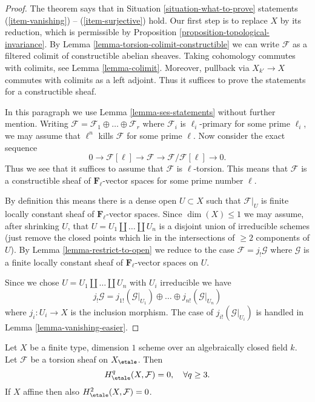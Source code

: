 \begin{proof}
The theorem says that in Situation \ref{situation-what-to-prove}
statements (\ref{item-vanishing}) -- (\ref{item-surjective}) hold.
Our first step is to replace $X$ by its reduction, which is permissible
by Proposition \ref{proposition-topological-invariance}.
By Lemma \ref{lemma-torsion-colimit-constructible} we can write
$\mathcal{F}$ as a filtered colimit of constructible abelian sheaves.
Taking cohomology commutes with colimits, see Lemma \ref{lemma-colimit}.
Moreover, pullback via $X_{k'} \to X$ commutes with colimits as a left
adjoint. Thus it suffices to prove the statements for a constructible sheaf.

\medskip\noindent
In this paragraph we use Lemma \ref{lemma-ses-statements} without further
mention. Writing
$\mathcal{F} = \mathcal{F}_1 \oplus \ldots \oplus \mathcal{F}_r$
where $\mathcal{F}_i$ is $\ell_i$-primary for some prime $\ell_i$, we may
assume that $\ell^n$ kills $\mathcal{F}$ for some prime $\ell$. Now consider
the exact sequence
$$
0 \to \mathcal{F}[\ell] \to \mathcal{F} \to \mathcal{F}/\mathcal{F}[\ell] \to 0.
$$
Thus we see that it suffices to assume that $\mathcal{F}$ is $\ell$-torsion.
This means that $\mathcal{F}$ is a constructible sheaf of
$\mathbf{F}_\ell$-vector spaces for some prime number $\ell$.

\medskip\noindent
By definition this means there is a dense open $U \subset X$
such that $\mathcal{F}|_U$ is finite locally constant sheaf of
$\mathbf{F}_\ell$-vector spaces. Since $\dim(X) \leq 1$ we may
assume, after shrinking $U$, that $U = U_1 \amalg \ldots \amalg U_n$
is a disjoint union of irreducible schemes (just remove the closed
points which lie in the intersections of $\geq 2$ components of $U$).
By Lemma \ref{lemma-restrict-to-open} we reduce to the case
$\mathcal{F} = j_!\mathcal{G}$ where $\mathcal{G}$ is a finite
locally constant sheaf of $\mathbf{F}_\ell$-vector spaces on $U$.

\medskip\noindent
Since we chose $U = U_1 \amalg \ldots \amalg U_n$ with $U_i$ irreducible
we have
$$
j_!\mathcal{G} =
j_{1!}(\mathcal{G}|_{U_1}) \oplus \ldots \oplus
j_{n!}(\mathcal{G}|_{U_n})
$$
where $j_i : U_i \to X$ is the inclusion morphism.
The case of $j_{i!}(\mathcal{G}|_{U_i})$ is handled in
Lemma \ref{lemma-vanishing-easier}.
\end{proof}

\begin{theorem}
\label{theorem-vanishing-curves}
Let $X$ be a finite type, dimension $1$ scheme over an
algebraically closed field $k$. Let $\mathcal{F}$ be a torsion sheaf
on $X_\etale$. Then
$$
H_\etale^q(X, \mathcal{F}) = 0, \quad \forall q \geq 3.
$$
If $X$ affine then also $H_\etale^2(X, \mathcal{F}) = 0$.
\end{theorem}

